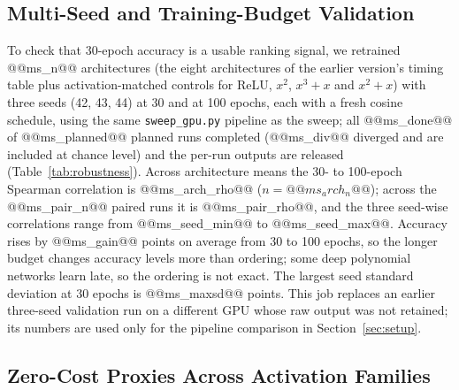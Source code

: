 \subsection{Multi-Seed and Training-Budget Validation}
\label{sec:robust}

To check that 30-epoch accuracy is a usable ranking signal, we retrained @@ms_n@@ architectures (the eight architectures of the earlier version's timing table plus activation-matched controls for ReLU, $x^2$, $x^3{+}x$ and $x^2{+}x$)
with three seeds (42, 43, 44) at 30 and at 100 epochs, each with a fresh cosine schedule, using the same \texttt{sweep\_gpu.py} pipeline as the sweep; all @@ms_done@@ of @@ms_planned@@ planned runs completed
(@@ms_div@@ diverged and are included at chance level) and the per-run outputs are released (Table~\ref{tab:robustness}).  Across architecture means the 30- to 100-epoch Spearman correlation is @@ms_arch_rho@@ ($n=@@ms_arch_n@@$);
across the @@ms_pair_n@@ paired runs it is @@ms_pair_rho@@, and the three seed-wise correlations range from @@ms_seed_min@@ to @@ms_seed_max@@.  Accuracy rises by @@ms_gain@@ points on average from 30 to 100 epochs,
so the longer budget changes accuracy levels more than ordering; some deep polynomial networks learn late, so the ordering is not exact.  The largest seed standard deviation at 30 epochs is @@ms_maxsd@@ points.
This job replaces an earlier three-seed validation run on a different GPU whose raw output was not retained; its numbers are used only for the pipeline comparison in Section~\ref{sec:setup}.



\subsection{Zero-Cost Proxies Across Activation Families}

